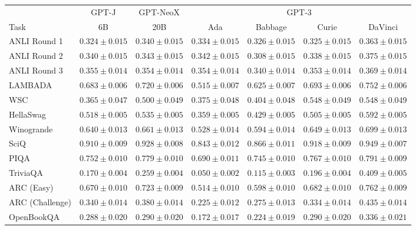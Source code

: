\documentclass[11pt]{article}
\begin{document}
{\onecolumn
\begin{landscape}
\begin{table}    
\centering %
\begin{tabular}{l c c c c c c }
 & GPT-J & GPT-NeoX & \multicolumn{4}{c}{GPT-3} \\
Task & 6B & 20B & Ada & Babbage & Curie & DaVinci\\ \toprule
ANLI Round 1 & $0.324 \pm 0.015$ & $0.340 \pm 0.015$ & $0.334 \pm 0.015$ & $0.326 \pm 0.015$ & $0.325 \pm 0.015$ & $0.363 \pm 0.015$ \\ 
ANLI Round 2 & $0.340 \pm 0.015$ & $0.343 \pm 0.015$ & $0.342 \pm 0.015$ & $0.308 \pm 0.015$ & $0.338 \pm 0.015$ & $0.375 \pm 0.015$ \\ 
ANLI Round 3 & $0.355 \pm 0.014$ & $0.354 \pm 0.014$ & $0.354 \pm 0.014$ & $0.340 \pm 0.014$ & $0.353 \pm 0.014$ & $0.369 \pm 0.014$ \\ 
LAMBADA & $0.683 \pm 0.006$ & $0.720 \pm 0.006$ & $0.515 \pm 0.007$ & $0.625 \pm 0.007$ & $0.693 \pm 0.006$ & $0.752 \pm 0.006$ \\ 
WSC & $0.365 \pm 0.047$ & $0.500 \pm 0.049$ & $0.375 \pm 0.048$ & $0.404 \pm 0.048$ & $0.548 \pm 0.049$ & $0.548 \pm 0.049$ \\ 
HellaSwag & $0.518 \pm 0.005$ & $0.535 \pm 0.005$ & $0.359 \pm 0.005$ & $0.429 \pm 0.005$ & $0.505 \pm 0.005$ & $0.592 \pm 0.005$ \\ 
Winogrande & $0.640 \pm 0.013$ & $0.661 \pm 0.013$ & $0.528 \pm 0.014$ & $0.594 \pm 0.014$ & $0.649 \pm 0.013$ & $0.699 \pm 0.013$ \\ 
SciQ & $0.910 \pm 0.009$ & $0.928 \pm 0.008$ & $0.843 \pm 0.012$ & $0.866 \pm 0.011$ & $0.918 \pm 0.009$ & $0.949 \pm 0.007$ \\ 
PIQA & $0.752 \pm 0.010$ & $0.779 \pm 0.010$ & $0.690 \pm 0.011$ & $0.745 \pm 0.010$ & $0.767 \pm 0.010$ & $0.791 \pm 0.009$ \\ 
TriviaQA & $0.170 \pm 0.004$ & $0.259 \pm 0.004$ & $0.050 \pm 0.002$ & $0.115 \pm 0.003$ & $0.196 \pm 0.004$ & $0.409 \pm 0.005$ \\ 
ARC (Easy) & $0.670 \pm 0.010$ & $0.723 \pm 0.009$ & $0.514 \pm 0.010$ & $0.598 \pm 0.010$ & $0.682 \pm 0.010$ & $0.762 \pm 0.009$ \\ 
ARC (Challenge) & $0.340 \pm 0.014$ & $0.380 \pm 0.014$ & $0.225 \pm 0.012$ & $0.275 \pm 0.013$ & $0.334 \pm 0.014$ & $0.435 \pm 0.014$ \\ 
OpenBookQA & $0.288 \pm 0.020$ & $0.290 \pm 0.020$ & $0.172 \pm 0.017$ & $0.224 \pm 0.019$ & $0.290 \pm 0.020$ & $0.336 \pm 0.021$ \\ 

\end{tabular}
\end{table}
\end{landscape}}
\end{document}
